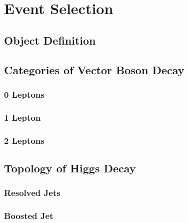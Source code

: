 \chapter{Event Selection}

\section{Object Definition}

\section{Categories of Vector Boson Decay}

\subsection{0 Leptons}

\subsection{1 Lepton}

\subsection{2 Leptons}

\section{Topology of Higgs Decay}

\subsection{Resolved Jets}

\subsection{Boosted Jet}
